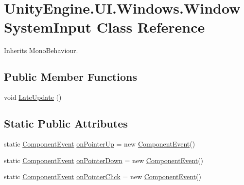 \hypertarget{class_unity_engine_1_1_u_i_1_1_windows_1_1_window_system_input}{}\section{Unity\+Engine.\+U\+I.\+Windows.\+Window\+System\+Input Class Reference}
\label{class_unity_engine_1_1_u_i_1_1_windows_1_1_window_system_input}


Inherits Mono\+Behaviour.

\subsection*{Public Member Functions}
\begin{DoxyCompactItemize}
\item 
void \hyperlink{class_unity_engine_1_1_u_i_1_1_windows_1_1_window_system_input_aa3ac660290df67f1f44a7940078a2b8a}{Late\+Update} ()
\end{DoxyCompactItemize}
\subsection*{Static Public Attributes}
\begin{DoxyCompactItemize}
\item 
static \hyperlink{class_unity_engine_1_1_u_i_1_1_windows_1_1_components_1_1_events_1_1_component_event}{Component\+Event} \hyperlink{class_unity_engine_1_1_u_i_1_1_windows_1_1_window_system_input_a580cd0bea2bd1db8ffff06a9013d2f77}{on\+Pointer\+Up} = new \hyperlink{class_unity_engine_1_1_u_i_1_1_windows_1_1_components_1_1_events_1_1_component_event}{Component\+Event}()
\item 
static \hyperlink{class_unity_engine_1_1_u_i_1_1_windows_1_1_components_1_1_events_1_1_component_event}{Component\+Event} \hyperlink{class_unity_engine_1_1_u_i_1_1_windows_1_1_window_system_input_aa03e666552b8067e984960fe956fec02}{on\+Pointer\+Down} = new \hyperlink{class_unity_engine_1_1_u_i_1_1_windows_1_1_components_1_1_events_1_1_component_event}{Component\+Event}()
\item 
static \hyperlink{class_unity_engine_1_1_u_i_1_1_windows_1_1_components_1_1_events_1_1_component_event}{Component\+Event} \hyperlink{class_unity_engine_1_1_u_i_1_1_windows_1_1_window_system_input_ad492a40772fd0c077bc3dc57a04e9b9d}{on\+Pointer\+Click} = new \hyperlink{class_unity_engine_1_1_u_i_1_1_windows_1_1_components_1_1_events_1_1_component_event}{Component\+Event}()
\end{DoxyCompactItemize}


